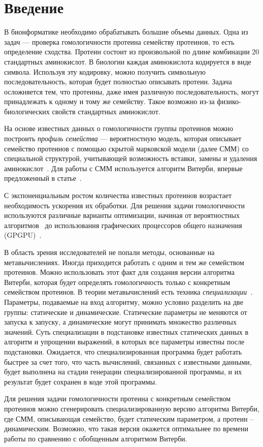 \section*{Введение}

В бионформатике необходимо обрабатывать большие объемы данных.
Одна из задач --- проверка гомологичности протеина семейству протеинов, 
то есть определение сходства.
Протеин состоит из произвольной по длине комбинации 20 стандартных аминокислот.
В биологии каждая аминокислота кодируется в виде символа.
Используя эту кодировку, можно получить символьную последовательность,
которая будет полностью описывать протеин.
Задача осложняется тем, что протеины, даже имея различную последовательность,
могут принадлежать к одному и тому же семейству.
Такое возможно из-за физико-биологических свойств стандартных аминокислот.

На основе известных данных о гомологичности группы протеинов 
можно построить \emph{профиль семейства} --- вероятностную модель, 
которая описывает семейство протеинов с помощью 
скрытой марковской модели (далее СММ) со специальной структурой,
учитывающей возможность вставки, замены и удаления аминокислот~\cite{HMM_Eddy}.
Для работы с СММ используется алгоритм Витерби, впервые предложенный в статье~\cite{Viterbi}.

С экспоненциальным ростом количества известных протеинов возрастает
необходимость ускорения их обработки.
Для решения задачи гомологичности используются различные варианты оптимизации,
начиная от вероятностных алгоритмов~\cite{MSV_Eddy} 
до использования графических процессоров общего назначения (GPGPU)~\cite{cudampf}.

В область зрения исследователей не попали методы, 
основанные на метавычислениях.
Иногда приходится работать с одним и тем же семейством протеинов.
Можно использовать этот факт для создания версии алгоритма Витерби, 
которая будет определять гомологичность только с конкретным семейством протеинов.
В теории метавычислений есть техника \emph{специализации}~\cite{Jones_spec}.
Параметры, подаваемые на вход алгоритму, можно условно разделить на две группы:
статические и динамические.
Статические параметры не меняются от запуска к запуску, 
а динамические могут принимать множество различных значений.
Суть специализации в подстановке известных статических 
данных в алгоритм и упрощении выражений, 
в которых все параметры известны после подстановки.
Ожидается, что специализированная программа будет работать быстрее за счет того, что часть вычислений, связанных с известными данными, будет выполнена на стадии генерации специализированной программы,
и их результат будет сохранен в коде этой программы.

Для решения задачи гомологичности протеина с конкретным семейством протеинов 
можно сгенерировать специализированную версию алгоритма Витерби,
где СММ, описывающая семейство, будет статическим параметром, 
а протеин -- динамическим.
Возможно, что такая версия окажется оптимальнее по времени работы 
по сравнению с обобщенным алгоритмом Витерби.
